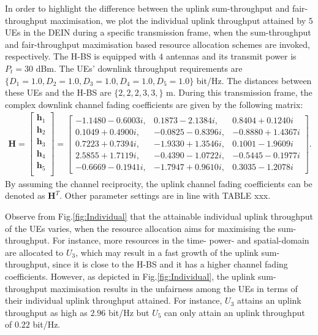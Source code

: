 \documentclass[12pt,draft,onecolumn,journal]{IEEEtran}
\begin{document}
In order to highlight the difference between the uplink sum-throughput and fair-throughput maximisation, we plot the individual uplink throughput attained by $5$ UEs in the DEIN during a specific transmission frame, when the sum-throughput and fair-throughput maximisation based resource allocation schemes are invoked, respectively. The H-BS is equipped with $4$ antennas and its transmit power is $P_t=30$ dBm. The UEs' downlink throughput requirements are $\{D_1=1.0, D_2=1.0, D_3=1.0, D_4=1.0, D_5=1.0\}$ bit/Hz. The distances between these UEs and the H-BS are $\{2,2,2,3,3,\}$ m. During this transmission frame, the complex downlink channel fading coefficients are given by the following matrix:
\begin{align}
	\mathbf{H} = \left[
		\begin{array}{l}
		\mathbf{h}_1 \\
		\mathbf{h}_2 \\
		\mathbf{h}_3 \\
		\mathbf{h}_4 \\
		\mathbf{h}_5 \\
		\end{array}
		\right] = \left[
		\begin{array}{lll}
			-1.1480 - 0.6003i, &   0.1873 - 2.1384i, &   0.8404 + 0.1240i \\
			0.1049 + 0.4900i, &  -0.0825 - 0.8396i, &  -0.8880 + 1.4367i  \\
 			0.7223 + 0.7394i, &  -1.9330 + 1.3546i, &   0.1001 - 1.9609i  \\
 			2.5855 + 1.7119i, &  -0.4390 - 1.0722i, &  -0.5445 - 0.1977i  \\
 			-0.6669 - 0.1941i, &  -1.7947 + 0.9610i, &   0.3035 - 1.2078i
		\end{array}
		\right].
\end{align}
By assuming the channel reciprocity, the uplink channel fading coefficients can be denoted as $\mathbf{H}^T$. Other parameter settings are in line with TABLE xxx.

Observe from Fig.\ref{fig:Individual} that the attainable individual uplink throughput of the UEs varies, when the resource allocation aims for maximising the sum-throughput. For instance, more resources in the time- power- and spatial-domain are allocated to $U_3$, which may result in a fast growth of the uplink sum-throughput, since it is close to the H-BS and it has a higher channel fading coefficients. However, as depicted in Fig.\ref{fig:Individual}, the uplink sum-throughput maximisation results in the unfairness among the UEs in terms of their individual uplink throughput attained. For instance, $U_3$ attains an uplink throughput as high as $2.96$ bit/Hz but $U_5$ can only attain an uplink throughput of $0.22$ bit/Hz.
\end{document}
